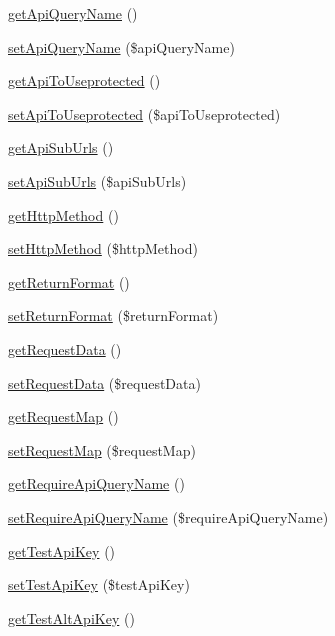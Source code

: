 \begin{DoxyCompactItemize}
\item 
\hyperlink{classCXLApiComponent_a62f41a9fb76a981daa867ce583ab0694}{getApiQueryName} ()
\item 
\hyperlink{classCXLApiComponent_aee7fd9023a9ba85260e127060c761508}{setApiQueryName} (\$apiQueryName)
\item 
\hyperlink{classCXLApiComponent_ad3f03754afe9b241f606ce5337d0dde4}{getApiToUseprotected} ()
\item 
\hyperlink{classCXLApiComponent_aac8da7c2f29d0e612e7643c188a90493}{setApiToUseprotected} (\$apiToUseprotected)
\item 
\hyperlink{classCXLApiComponent_aa9cc1a3f709c744893c276647052df7b}{getApiSubUrls} ()
\item 
\hyperlink{classCXLApiComponent_a4613f1c6f82dce6e98baa72135e42266}{setApiSubUrls} (\$apiSubUrls)
\item 
\hyperlink{classCXLApiComponent_a28507580eea1c43f0c9599aa095d09a8}{getHttpMethod} ()
\item 
\hyperlink{classCXLApiComponent_a3504f14e8de18a8fb0794189f097e0e2}{setHttpMethod} (\$httpMethod)
\item 
\hyperlink{classCXLApiComponent_a5a6594548fdca4102f6f27a8fff64b4c}{getReturnFormat} ()
\item 
\hyperlink{classCXLApiComponent_aff4de7b5a1768634443f47b5c7ead556}{setReturnFormat} (\$returnFormat)
\item 
\hyperlink{classCXLApiComponent_aee166055c31ccd75b6d4ac78b22b244c}{getRequestData} ()
\item 
\hyperlink{classCXLApiComponent_ae588dab5917e2d43521a9fdf477e74a2}{setRequestData} (\$requestData)
\item 
\hyperlink{classCXLApiComponent_a4db9ef86c05e67f9b01f4568436b9845}{getRequestMap} ()
\item 
\hyperlink{classCXLApiComponent_a5b1319a13b89df625b519605c2166958}{setRequestMap} (\$requestMap)
\item 
\hyperlink{classCXLApiComponent_ab98fe1e464231f6f2f19350ab2043d28}{getRequireApiQueryName} ()
\item 
\hyperlink{classCXLApiComponent_a373b29a45b2be5fd160067604c03a543}{setRequireApiQueryName} (\$requireApiQueryName)
\item 
\hyperlink{classCXLApiComponent_a408f8531c27a6f76ee849163a36a3eb3}{getTestApiKey} ()
\item 
\hyperlink{classCXLApiComponent_a727ba895de76d3d82a09ae68b7f7424a}{setTestApiKey} (\$testApiKey)
\item 
\hyperlink{classCXLApiComponent_a80a2273fea0b94d8b50776e5b1d8366a}{getTestAltApiKey} ()

\end{DoxyCompactItemize}
